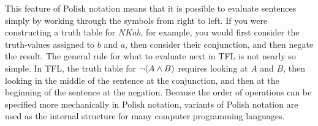 This feature of Polish notation means that it is possible to evaluate sentences simply by working through the symbols from right to left. If you were constructing a truth table for $NKab$, for example, you would first consider the truth-values assigned to $b$ and $a$, then consider their conjunction, and then negate the result. The general rule for what to evaluate next in TFL is not nearly so simple. In TFL, the truth table for $\neg(A\wedge B)$ requires looking at $A$ and $B$, then looking in the middle of the sentence at the conjunction, and then at the beginning of the sentence at the negation. Because the order of operations can be specified more mechanically in Polish notation, variants of Polish notation are used as the internal structure for many computer programming languages.

